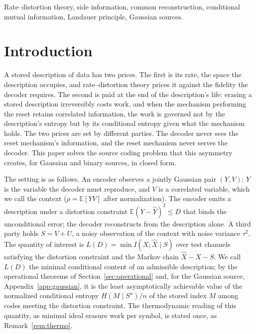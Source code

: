 ﻿\documentclass[11pt,onecolumn]{IEEEtran}
\newcommand{\E}{\mathbb{E}}
\newcommand{\hX}{\widehat{X}}
\newcommand{\hY}{\widehat{Y}}
\begin{document}
\begin{IEEEkeywords}
Rate--distortion theory, side information, common reconstruction, conditional
mutual information, Landauer principle, Gaussian sources.
\end{IEEEkeywords}

\section{Introduction}
\label{sec:intro}

A stored description of data has two prices. The first is its rate, the space
the description occupies, and rate--distortion theory prices it against the
fidelity the decoder requires. The second is paid at the end of the
description's life: erasing a stored description irreversibly costs work, and
when the mechanism performing the reset retains correlated information, the
work is governed not by the description's entropy but by its conditional
entropy given what the mechanism holds. The two prices are set by different
parties. The decoder never sees the reset mechanism's information, and the
reset mechanism never serves the decoder. This paper solves the source coding problem that this
asymmetry creates, for Gaussian and binary sources, in closed form.

The setting is as follows. An encoder observes a jointly Gaussian pair
$(Y,V)$: $Y$ is the variable the decoder must reproduce, and $V$ is a
correlated variable, which we call the context ($\rho=\E[YV]$ after
normalization). The encoder emits a description under a distortion constraint
$\E(Y-\hY)^2\le D$ that binds the unconditional error; the decoder
reconstructs from the description alone. A third
party holds $S=V+U$, a noisy observation of the context with noise variance
$\tau^2$. The quantity of interest is
$L(D)=\min I(X;\hX\mid S)$ over test channels satisfying the distortion
constraint and the Markov chain $\hX-X-S$. We call $L(D)$ the minimal
conditional content of an admissible description; by the operational
theorems of Section~\ref{sec:operational} and, for the Gaussian source,
Appendix~\ref{app:gaussian}, it is the least asymptotically achievable
value of the normalized conditional entropy $H(M\mid S^n)/n$ of the stored
index $M$ among codes meeting the distortion constraint. The
thermodynamic reading of this quantity, as minimal ideal erasure work
per symbol, is stated once, as Remark~\ref{rem:thermo}.
\end{document}
